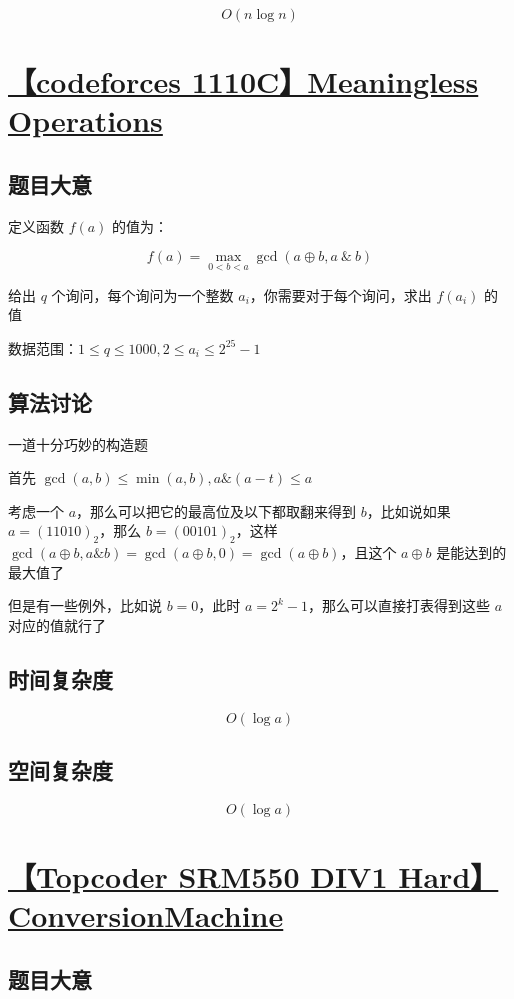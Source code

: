 \documentclass[UTF8]{article}
\begin{document}
$$
O(n \log n)
$$

\section{\href{https://codeforces.com/problemset/problem/1110/C}{【codeforces 1110C】Meaningless Operations}}

\subsection{题目大意}

定义函数 $f(a)$ 的值为：

$$
f(a)=\max_{0<b<a}\gcd(a\oplus b,a\ \&\ b)
$$

给出 $q$ 个询问，每个询问为一个整数 $a_i$，​你需要对于每个询问，求出 $f(a_i)$ 的值

数据范围：$1\le q \le 1000, 2\le a_i\le 2^{25}-1$

\subsection{算法讨论}

一道十分巧妙的构造题

首先 $\gcd(a, b) \le \min(a, b),a \& (a-t) \le a$

考虑一个 $a$，那么可以把它的最高位及以下都取翻来得到 $b$，比如说如果 $a=(11010)_2$，那么 $b=(00101)_2$，这样 $\gcd(a \oplus b, a \& b)=\gcd(a \oplus b, 0)=\gcd(a \oplus b)$，且这个 $a \oplus b$ 是能达到的最大值了

但是有一些例外，比如说 $b=0$，此时 $a=2^k-1$，那么可以直接打表得到这些 $a$ 对应的值就行了

\subsection{时间复杂度}

$$
O(\log a)
$$

\subsection{空间复杂度}

$$
O(\log a)
$$

\section{\href{https://vjudge.net/problem/TopCoder-12118}{【Topcoder SRM550 DIV1 Hard】ConversionMachine}}

\subsection{题目大意}
\end{document}
